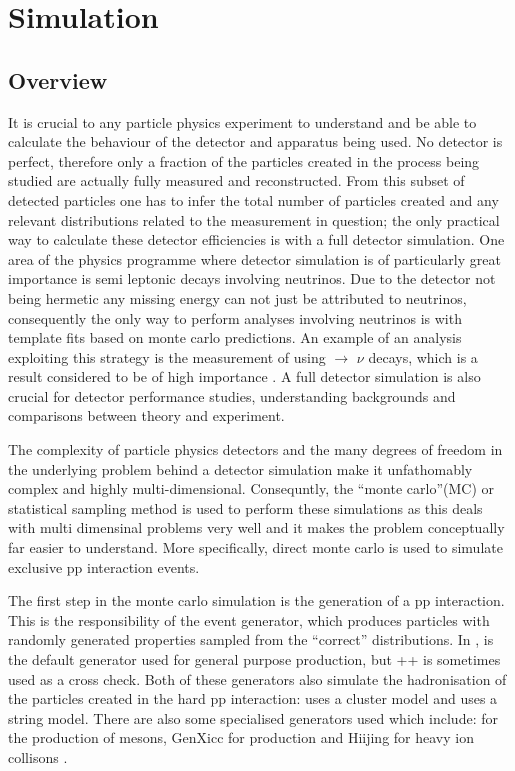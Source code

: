 
\section{Simulation}
\setcounter{secnumdepth}{5}
\label{sec:Simulation}
\subsection{Overview}
It is crucial to any particle physics experiment to understand and be able to calculate the behaviour of the detector and apparatus being used.  No detector is perfect, therefore only a fraction of the particles created in the process being studied are actually fully measured and reconstructed.  From this subset of detected particles one has to infer the total number of particles created and any relevant distributions related to the measurement in question; the only practical way to calculate these detector efficiencies is with a full detector simulation.  One area of the \lhcb physics programme where detector simulation is of particularly great importance is semi leptonic decays involving neutrinos.  Due to the \lhcb detector not being hermetic any missing energy can not just be attributed to neutrinos, consequently the only way to perform analyses involving neutrinos is with template fits based on monte carlo predictions.  An example of an analysis exploiting this strategy is the measurement of \Vub using \Lb $\rightarrow$ \proton \muon $\nu$ decays, which is a result considered to be of high importance \cite{LHCb-PAPER-2015-013}.  A full detector simulation is also crucial for detector performance studies, understanding backgrounds and comparisons between theory and experiment.

The complexity of particle physics detectors and the many degrees of freedom in the underlying problem behind a detector simulation make it unfathomably complex and highly multi-dimensional.  Consequntly, the ``monte carlo''(MC) or statistical sampling method is used to perform these simulations as this deals with multi dimensinal problems very well and it makes the problem conceptually far easier to understand.  More specifically, direct monte carlo is used to simulate exclusive pp interaction events.

The first step in the monte carlo simulation is the generation of a pp interaction.  This is the responsibility of the event generator, which produces particles with randomly generated properties sampled from the ``correct'' distributions.  In \lhcb, \pythia is the default generator used for general purpose production, but \herwig++ is sometimes used as a cross check.  Both of these generators also simulate the hadronisation of the particles created in the hard pp interaction: \herwig uses a cluster model and \pythia uses a string model\cite{Sjostrand:2007gs,Herwig}.  There are also some specialised generators used which include: \bcvegpy for the production of \Bc mesons, GenXicc for \Xic production and Hiijing for heavy ion collisons \cite{bcvegpy,Gyulassy:1994ew,Chang:2007pp}.

